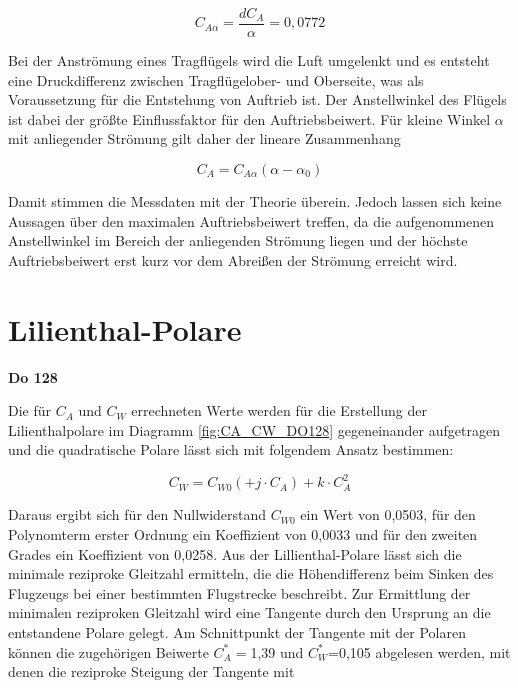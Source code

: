 \begin{equation}
C_{A\alpha}=\frac{dC_A}{\alpha}=0,0772
\end{equation}

	
Bei der Anströmung eines Tragflügels wird die Luft umgelenkt und es entsteht eine Druckdifferenz zwischen Tragflügelober- und Oberseite, was als Voraussetzung für die Entstehung von Auftrieb ist. Der Anstellwinkel des Flügels ist dabei der größte Einflussfaktor für den Auftriebsbeiwert. Für kleine Winkel $\alpha$ mit anliegender Strömung gilt daher der lineare Zusammenhang \cite{Skript}

\begin{equation}
C_A=C_{A\alpha} \left(\alpha - \alpha_0\right)
\end{equation}

Damit stimmen die Messdaten mit der Theorie überein. Jedoch lassen sich keine Aussagen über den maximalen Auftriebsbeiwert treffen, da die aufgenommenen Anstellwinkel im Bereich der anliegenden Strömung liegen und der höchste Auftriebsbeiwert erst kurz vor dem Abreißen der Strömung erreicht wird. 

\section{Lilienthal-Polare}

\textbf{Do 128}

Die für $C_A$ und $C_W$ errechneten Werte werden für die Erstellung der Lilienthalpolare im Diagramm \ref{fig:CA_CW_DO128} gegeneinander aufgetragen und die quadratische Polare lässt sich mit folgendem Ansatz \cite{Skript} bestimmen:

\begin{equation}
C_W = C_{W0} (+ j \cdot C_A) + k \cdot C_{A}^2
\end{equation}

 Daraus ergibt sich für den Nullwiderstand $C_{W0}$ ein Wert von 0,0503, für den Polynomterm erster Ordnung ein Koeffizient von 0,0033 und für den zweiten Grades ein Koeffizient von 0,0258. 
Aus der Lillienthal-Polare lässt sich die minimale reziproke Gleitzahl ermitteln, die die Höhendifferenz beim Sinken des Flugzeugs bei einer bestimmten Flugstrecke beschreibt. Zur Ermittlung der minimalen reziproken Gleitzahl wird eine Tangente durch den Ursprung an die entstandene Polare gelegt. Am Schnittpunkt der Tangente mit der Polaren können die zugehörigen Beiwerte $C_A^*=$1,39 und  $C_W^*$=0,105 abgelesen werden, mit denen die reziproke Steigung der Tangente mit

